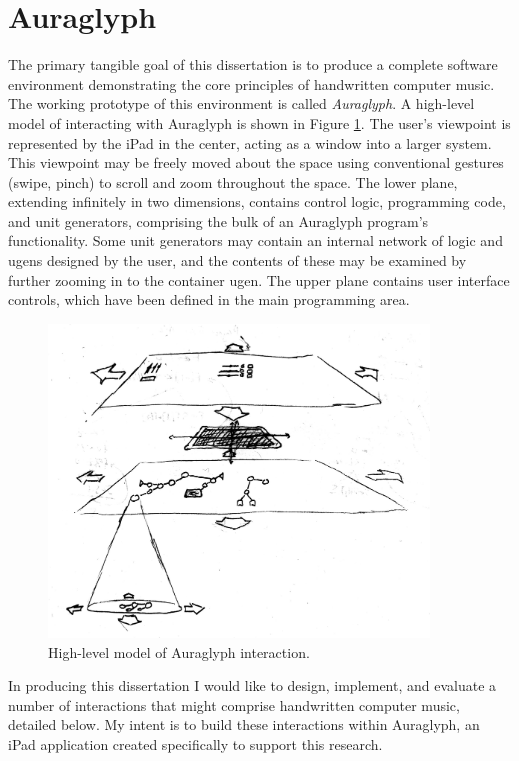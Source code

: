 \documentclass[10pt,letterpaper]{article}
\begin{document}
\section{Auraglyph}
\label{sec:Auraglyph}

The primary tangible goal of this dissertation is to produce a complete software environment demonstrating the core principles of handwritten computer music. 
The working prototype of this environment is called \emph{Auraglyph}. 
A high-level model of interacting with Auraglyph is shown in Figure \ref{fig:auraglyphSystem}. 
The user's viewpoint is represented by the iPad in the center, acting as a window into a larger system. 
This viewpoint may be freely moved about the space using conventional gestures (swipe, pinch) to scroll and zoom throughout the space. 
The lower plane, extending infinitely in two dimensions, contains control logic, programming code, and unit generators, comprising the bulk of an Auraglyph program's functionality.
Some unit generators may contain an internal network of logic and ugens designed by the user, and the contents of these may be examined by further zooming in to the container ugen.  
The upper plane contains user interface controls, which have been defined in the main programming area. 


\begin{figure}[h!]
	\centering
		\includegraphics[width=0.9\textwidth]{figures/HWCM-model.jpeg}
	\caption{High-level model of Auraglyph interaction. }
	\label{fig:auraglyphSystem}
\end{figure}


In producing this dissertation I would like to design, implement, and evaluate a number of interactions that might comprise handwritten computer music, detailed below. 
My intent is to build these interactions within Auraglyph, an iPad application created specifically to support this research. 
\end{document}
